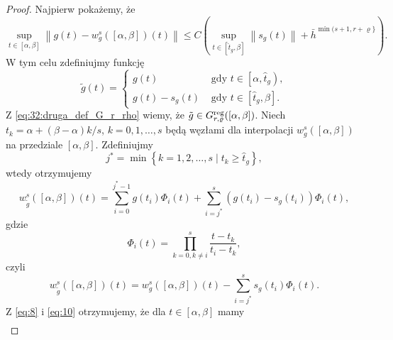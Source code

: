 \documentclass[oik, pdftex, robocza, man]{mgrwms}
\begin{document}
    \begin{proof}
        Najpierw pokażemy, że
        \begin{equation} \label{eq:7}
            \sup _{t \in[\alpha, \beta]}\left\|g(t)-w_{g}^{s}([\alpha, \beta])(t)\right\| \leq C\left(\sup _{t \in\left[\hat{t}_{g}, \beta\right]}\left\|s_{g}(t)\right\|+\bar{h}^{\min (s+1, r+\varrho\}}\right).
        \end{equation}
        W tym celu zdefiniujmy funkcję
        \begin{equation} \label{eq:8:tilde_g_z_minusem}
            \tilde{g}(t)= \begin{cases}
                g(t)            & \text { gdy } t \in\left[\alpha, \hat{t}_{g}\right), \\ 
                g(t)-s_{g}(t)   & \text { gdy } t \in\left[\hat{t}_{g}, \beta\right].
            \end{cases}
        \end{equation}
        Z \eqref{eq:32:druga_def_G_r_rho} wiemy, że $\tilde{g} \in G_{r, \varrho}^{\mathrm{reg}}([\alpha, \beta])$. Niech $t_{k}=\alpha+(\beta-\alpha) k / s$, $k=0,1, \ldots, s$ będą węzłami dla interpolacji $w_{g}^{s}([\alpha, \beta])$ na przedziale $[\alpha, \beta]$. Zdefiniujmy
        \begin{equation} \label{eq:9}
            j^{*}=\min \left\{k=1,2, \ldots, s \mid t_{k} \geq \hat{t}_{g}\right\},
        \end{equation}
        wtedy otrzymujemy
        \begin{equation} \label{eq:10}
            w_{\tilde{g}}^{s}([\alpha, \beta])(t)=\sum_{i=0}^{j^{*}-1} g\left(t_{i}\right) \Phi_{i}(t)+\sum_{i=j^{*}}^{s}\left(g\left(t_{i}\right)-s_{g}\left(t_{i}\right)\right) \Phi_{i}(t),
        \end{equation}
        gdzie
        \begin{equation*}
            \Phi_{i}(t)=\prod_{k=0, k \neq i}^{s} \frac{t-t_{k}}{t_{i}-t_{k}},
        \end{equation*}
        czyli
        \begin{equation*} \label{eq:11}
            w_{\tilde{g}}^{s}([\alpha, \beta])(t)=w_{g}^{s}([\alpha, \beta])(t)-\sum_{i=j^{*}}^{s} s_{g}\left(t_{i}\right) \Phi_{i}(t).
        \end{equation*}
        Z \eqref{eq:8} i \eqref{eq:10} otrzymujemy, że dla $t \in [\alpha, \beta]$ mamy
        \begin{equation*} \label{eq:12}
            \begin{aligned}

\end{aligned}
\end{equation*}
\end{proof}
\end{document}
